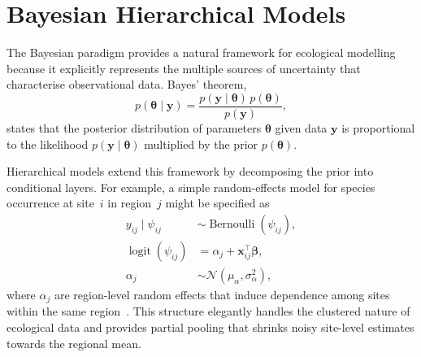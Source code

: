 \section{Bayesian Hierarchical Models}

The Bayesian paradigm provides a natural framework for ecological modelling
because it explicitly represents the multiple sources of uncertainty that
characterise observational data. Bayes' theorem,
\begin{equation}\label{eq:bayes}
  p(\boldsymbol{\theta} \mid \mathbf{y}) =
  \frac{p(\mathbf{y} \mid \boldsymbol{\theta})\, p(\boldsymbol{\theta})}
       {p(\mathbf{y})},
\end{equation}
states that the posterior distribution of parameters $\boldsymbol{\theta}$
given data $\mathbf{y}$ is proportional to the likelihood
$p(\mathbf{y}\mid\boldsymbol{\theta})$ multiplied by the prior
$p(\boldsymbol{\theta})$.

Hierarchical models extend this framework by decomposing the prior into
conditional layers. For example, a simple random-effects model for species
occurrence at site~$i$ in region~$j$ might be specified as
\begin{align}
  y_{ij} \mid \psi_{ij} &\sim \operatorname{Bernoulli}(\psi_{ij}), \\
  \operatorname{logit}(\psi_{ij}) &= \alpha_j + \mathbf{x}_{ij}^\top
    \boldsymbol{\beta}, \\
  \alpha_j &\sim \mathcal{N}(\mu_\alpha, \sigma^2_\alpha),
\end{align}
where $\alpha_j$ are region-level random effects that induce dependence among
sites within the same region~\cite{gelman2013}. This structure elegantly
handles the clustered nature of ecological data and provides partial pooling
that shrinks noisy site-level estimates towards the regional mean.
